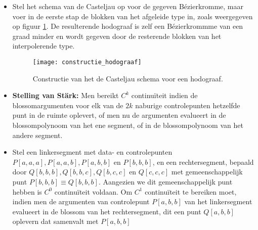 \documentclass{report}
\begin{document}
\begin{itemize}
	{
		\begin{itemize}
			\item Stel het schema van de Casteljau op voor de gegeven Bézierkromme, maar voer in de eerste stap de blokken van het afgeleide type in, zoals weergegeven op figuur \ref{fig:constructie_hodograaf}. De resulterende hodograaf is zelf een Bézierkrommme van een graad minder en wordt gegeven door de resterende blokken van het interpolerende type.
			\begin{figure}[ht]
				\centering
				\texttt{[image: constructie\_hodograaf]}	
				\caption{Constructie van het de Casteljau schema voor een hodograaf.}
				\label{fig:constructie_hodograaf}
			\end{figure}
		\end{itemize}
		
	}
	{
		\begin{itemize} 
		\item \textbf{Stelling van Stärk:} Men bereikt $C^k$ continuïteit indien de blossomargumenten voor elk van de $2k$ naburige controlepunten hetzelfde punt in de ruimte oplevert, of men nu de argumenten evalueert in de blossompolynoom van het ene segment, of in de blossompolynoom van het andere segment. 
		\item Stel een linkersegment met data- en controlepunten $P[a, a, a], P[a, a, b], P[a, b, b]$ en $P[b, b, b]$, en een rechtersegment, bepaald door $Q[b, b, b], Q[b, b, c], Q[b, c, c]$ en $Q[c, c, c]$ met gemeenschappelijk punt $P[b, b, b] \equiv Q[b, b, b]$. Aangezien we dit gemeenschappelijk punt hebben is $C^0$ continuïteit voldaan. Om $C^1$ continuïteit te bereiken moet, indien men de argumenten van controlepunt $P[a, b, b]$ van het linkersegment evalueert in de blossom van het rechtersegment, dit een punt $Q[a, b, b]$ oplevern dat samenvalt met $P[a, b, b]$
			

\end{itemize}}
\end{itemize}
\end{document}
